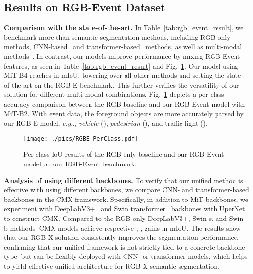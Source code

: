 \documentclass[journal]{IEEEtran}
\makeatletter
\DeclareRobustCommand\onedot{\futurelet\@let@token\@onedot}
\def\@onedot{\ifx\@let@token.\else.\null\fi\xspace}
\def\eg{\emph{e.g}\onedot} \def\Eg{\emph{E.g}\onedot}
\makeatother
\begin{document}
\subsection{Results on RGB-Event Dataset}
\label{sec:results_rgbe}


\noindent\textbf{Comparison with the state-of-the-art.}
In Table~\ref{tab:rgb_event_result}, we benchmark more than  semantic segmentation methods, including RGB-only methods,  CNN-based~\cite{orsic2019swiftnet,Poudel2019FastSCNNFS,Wu2021CGNetAL,chen2018deeplabv3+} and transformer-based~\cite{liu2021swin,xie2021segformer,zhang2021trans4trans_iccvw} methods, as well as multi-modal methods~\cite{sun2020rfnet,chen2020sa_gate,zhang2021issafe}. In contrast, our models improve performance by mixing RGB-Event features, as seen in Table~\ref{tab:rgb_event_result} and Fig.~\ref{fig:RGBE_perclass}.
Our model using MiT-B4 reaches  in mIoU, towering over all other methods and setting the state-of-the-art on the RGB-E benchmark.
This further verifies the versatility of our solution for different multi-modal combinations.
Fig.~\ref{fig:RGBE_perclass} depicts a per-class accuracy comparison between the RGB baseline and our RGB-Event model with MiT-B2.
With event data, the foreground objects are more accurately parsed by our RGB-E model, \eg, \emph{vehicle} (), \emph{pedestrian} (), and traffic light ().
\begin{figure}[t]
   \centering
   \texttt{[image: ./pics/RGBE\_PerClass.pdf]}
   \caption{Per-class IoU results of the RGB-only baseline and our RGB-Event model on our RGB-Event benchmark.} 
   \label{fig:RGBE_perclass}
\end{figure}

\noindent\textbf{Analysis of using different backbones.}
To verify that our unified method is effective with using different backbones, we compare CNN- and transformer-based backbones in the CMX framework. Specifically, in addition to MiT backbones, we experiment with DeepLabV3+~\cite{chen2018deeplabv3+} and Swin transformer~\cite{liu2021swin} backbones with UperNet~\cite{xiao2018upernet} to construct CMX.
Compared to the RGB-only DeepLabV3+, Swin-s, and Swin-b methods, CMX models achieve respective , ,  gains in mIoU. The results show that our RGB-X solution consistently improves the segmentation performance, confirming that our unified framework is not strictly tied to a concrete backbone type, but can be flexibly deployed with CNN- or transformer models, which helps to yield effective unified architecture for RGB-X semantic segmentation.
\end{document}
